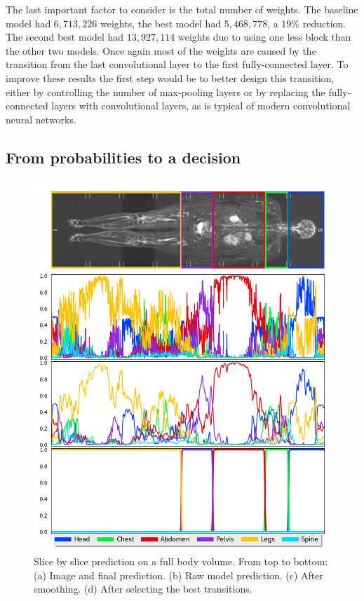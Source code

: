 The last important factor to consider is the total number of weights. The baseline model had $6,713,226$ weights, the best model had $5,468,778$, a $19 \%$ reduction. The second best model had $13,927,114$ weights due to using one less block than the other two models. Once again most of the weights are caused by the transition from the last convolutional layer to the first fully-connected layer. To improve these results the first step would be to better design this transition, either by controlling the number of max-pooling layers or by replacing the fully-connected layers with convolutional layers, as is typical of modern convolutional neural networks. 

\subsection{From probabilities to a decision}

\begin{figure}[htbp]
	\centering
	\includegraphics[width=\linewidth]{img_hyperopt/fullbody}
	\caption{Slice by slice prediction on a full body volume. From top to bottom: (a) Image and final prediction. (b) Raw model prediction. (c) After smoothing. (d) After selecting the best transitions.}
	\label{fig:full_body}
\end{figure}

